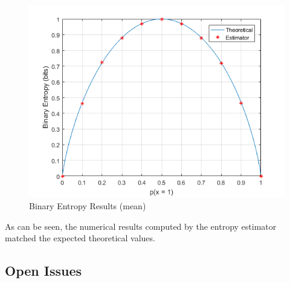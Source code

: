 \begin{refsection}
\begin{figure}[H]
\subsection*{}
    \centerline{
       \includegraphics[scale=0.60]{figures/Bin_entropy_results.png}
    }
\caption{Binary Entropy Results (mean)}
\end{figure}

As can be seen, the numerical results computed by the entropy estimator matched the expected theoretical values.  

\paragraph{}

\subsection*{Open Issues}

\newpage


\clearpage
\printbibliography[heading=subbibliography]
\end{refsection}
\cleardoublepage
